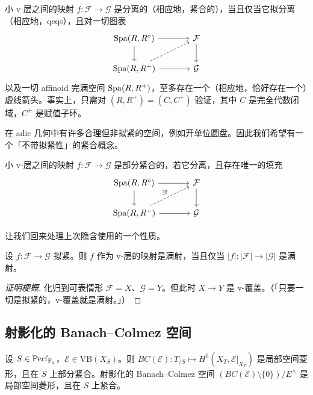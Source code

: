 \begin{proposition}
小 v-层之间的映射 $f\colon\mathcal{F}\to\mathcal{G}$ 是分离的（相应地，紧合的），当且仅当它拟分离（相应地，qcqs），且对一切图表
\[
\begin{tikzcd}[column sep=large]
\Spa(R,R^\circ) \arrow[r] \arrow[d] & \mathcal{F} \arrow[d]\\
\Spa(R,R^+) \arrow[r] \arrow[ur,dashed] & \mathcal{G}
\end{tikzcd}
\]
以及一切 affinoid 完满空间 $\operatorname{Spa}(R,R^+)$，至多存在一个（相应地，恰好存在一个）虚线箭头。事实上，只需对 $(R,R^+)=(C,C^+)$ 验证，其中 $C$ 是完全代数闭域，$C^+$ 是赋值子环。
\end{proposition}

在 adic 几何中有许多合理但非拟紧的空间，例如开单位圆盘。因此我们希望有一个「不带拟紧性」的紧合概念。

\begin{definition}
小 v-层之间的映射 $f\colon\mathcal{F}\to\mathcal{G}$ 是部分紧合的，若它分离，且存在唯一的填充
\[
\begin{tikzcd}[column sep=large]
\Spa(R,R^\circ) \arrow[r] \arrow[d] & \mathcal{F} \arrow[d]\\
\Spa(R,R^+) \arrow[r] \arrow[ur,dashed,"\exists!"] & \mathcal{G}
\end{tikzcd}
\]
\end{definition}

让我们回来处理上次隐含使用的一个性质。

\begin{proposition}
设 $f\colon\mathcal{F}\to\mathcal{G}$ 拟紧。则 $f$ 作为 v-层的映射是满射，当且仅当 $|f|\colon|\mathcal{F}|\to|\mathcal{G}|$ 是满射。
\end{proposition}

\begin{proof}[证明梗概]
化归到可表情形 $\mathcal{F}=X$、$\mathcal{G}=Y$。但此时 $X\to Y$ 是 v-覆盖。（「只要一切是拟紧的，v-覆盖就是满射。」）
\end{proof}

\subsection{射影化的 Banach--Colmez 空间}

\begin{proposition}
设 $S\in\mathrm{Perf}_{\mathbb{F}_q}$，$\mathcal{E}\in\mathrm{VB}(X_S)$。则 $BC(\mathcal{E})\colon T_{/S}\mapsto H^0(X_T,\mathcal{E}|_{X_T})$ 是局部空间菱形，且在 $S$ 上部分紧合。射影化的 Banach--Colmez 空间 $(BC(\mathcal{E})\setminus\{0\})/\underline{E}^\times$ 是局部空间菱形，且在 $S$ 上紧合。
\end{proposition}

